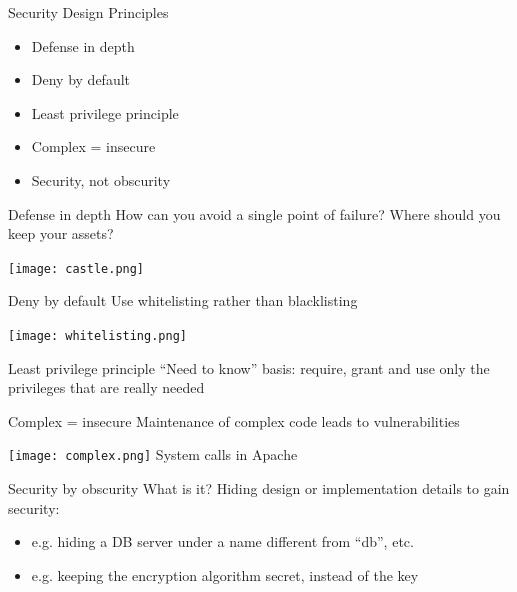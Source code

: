 \documentclass[aspectratio=169]{beamer}
\begin{document}

\begin{frame}{Security Design Principles}
  \begin{itemize}
    \item Defense in depth
    \item Deny by default
    \item Least privilege principle
    \item Complex = insecure
    \item Security, not obscurity
  \end{itemize}
\end{frame}

\begin{frame}{Defense in depth}
How can you avoid a single point of failure? Where should you keep your assets?
\begin{center}
\texttt{[image: castle.png]}
\end{center}
\end{frame}

\begin{frame}{{\color{red}Deny by default}}
Use whitelisting rather than blacklisting
\begin{center}
\texttt{[image: whitelisting.png]}
\end{center}
\end{frame}

\begin{frame}{Least privilege principle}
“Need to know” basis: require, grant and use only the privileges that are really needed
\end{frame}

\begin{frame}{Complex = insecure}
Maintenance of complex code leads to vulnerabilities
\begin{center}
\texttt{[image: complex.png]} \newline
System calls in Apache
\end{center}
\end{frame}

\begin{frame}{Security by obscurity}
What is it? Hiding design or implementation details to gain security:
\begin{itemize}
\item e.g. hiding a DB server under a name different from “db”, etc.
\item e.g. keeping the encryption algorithm secret, instead of the key
\end{itemize}
\end{frame}
\end{document}
